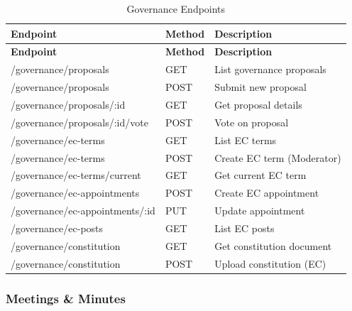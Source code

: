 \documentclass[12pt,a4paper]{article}
\begin{document}
\begin{longtable}{>{\small\ttfamily}p{6.5cm}%
                  >{\small\centering\arraybackslash}p{1.3cm}%
                  >{\small}p{6.7cm}}
\caption{Governance Endpoints} \\

\rowcolor{Teal}
\color{white}\normalfont\bfseries Endpoint & \color{white}\bfseries Method & \color{white}\bfseries Description \\
\endfirsthead
\rowcolor{Teal}
\color{white}\normalfont\bfseries Endpoint & \color{white}\bfseries Method & \color{white}\bfseries Description \\
\endhead

\midrule
\rowcolor{LightTeal}/governance/proposals & GET & List governance proposals \\
/governance/proposals & POST & Submit new proposal \\
\rowcolor{LightTeal}/governance/proposals/:id & GET & Get proposal details \\
/governance/proposals/:id/vote & POST & Vote on proposal \\
\rowcolor{LightTeal}/governance/ec-terms & GET & List EC terms \\
/governance/ec-terms & POST & Create EC term (Moderator) \\
\rowcolor{LightTeal}/governance/ec-terms/current & GET & Get current EC term \\
/governance/ec-appointments & POST & Create EC appointment \\
\rowcolor{LightTeal}/governance/ec-appointments/:id & PUT & Update appointment \\
/governance/ec-posts & GET & List EC posts \\
\rowcolor{LightTeal}/governance/constitution & GET & Get constitution document \\
/governance/constitution & POST & Upload constitution (EC) \\
\bottomrule
\end{longtable}

\subsubsection{Meetings \& Minutes}
\end{document}
